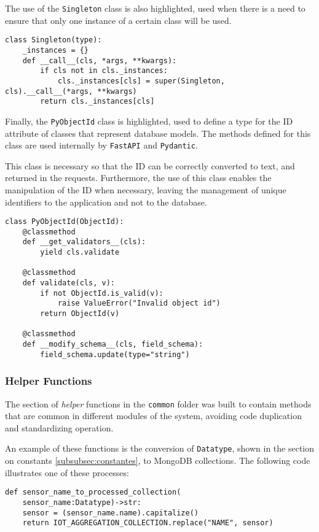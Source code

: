 The use of the \texttt{Singleton} class is also highlighted, used when there is a need to ensure that only one instance of a certain class will be used.

\begin{verbatim}
class Singleton(type):
    _instances = {}
    def __call__(cls, *args, **kwargs):
        if cls not in cls._instances:
            cls._instances[cls] = super(Singleton, cls).__call__(*args, **kwargs)
        return cls._instances[cls]
\end{verbatim}

Finally, the \texttt{PyObjectId} class is highlighted, used to define a type for the ID attribute of classes that represent database models. The methods defined for this class are used internally by \texttt{FastAPI} and \texttt{Pydantic}.

This class is necessary so that the ID can be correctly converted to text, and returned in the requests. Furthermore, the use of this class enables the manipulation of the ID when necessary, leaving the management of unique identifiers to the application and not to the database.

\begin{verbatim}
class PyObjectId(ObjectId):
    @classmethod
    def __get_validators__(cls):
        yield cls.validate

    @classmethod
    def validate(cls, v):
        if not ObjectId.is_valid(v):
            raise ValueError("Invalid object id")
        return ObjectId(v)

    @classmethod
    def __modify_schema__(cls, field_schema):
        field_schema.update(type="string")
\end{verbatim}

\subsubsection{Helper Functions}\label{subsubsec:helpers}

The section of \textit{helper} functions in the \texttt{common} folder was built to contain methods that are common in different modules of the system, avoiding code duplication and standardizing operation.

An example of these functions is the conversion of \texttt{Datatype}, shown in the section on constants \ref{subsubsec:constantes}, to MongoDB collections. The following code illustrates one of these processes:

\begin{verbatim}
def sensor_name_to_processed_collection(
    sensor_name:Datatype)->str:
    sensor = (sensor_name.name).capitalize()
    return IOT_AGGREGATION_COLLECTION.replace("NAME", sensor)
\end{verbatim}

